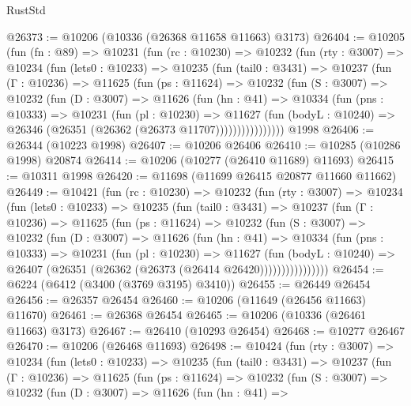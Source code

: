 \begin{lexlean}{RustStd}
\begin{coremodule}
@26373 := @10206 (@10336 (@26368 @11658 @11663) @3173)
@26404 := @10205
    (fun (fn : @89) =>
    @10231
      (fun (rc : @10230) =>
      @10232
        (fun (rty : @3007) =>
        @10234
          (fun (lets0 : @10233) =>
          @10235
            (fun (tail0 : @3431) =>
            @10237
              (fun (Γ : @10236) =>
              @11625
                (fun (ps : @11624) =>
                @10232
                  (fun (S : @3007) =>
                  @10232
                    (fun (D : @3007) =>
                    @11626
                      (fun (hn : @41) =>
                      @10334
                        (fun (pns : @10333) =>
                        @10231
                          (fun (pl : @10230) =>
                          @11627
                            (fun (bodyL : @10240) =>
                            @26346 (@26351 (@26362 (@26373 @11707))))))))))))))))
    @1998
@26406 := @26344 (@10223 @1998)
@26407 := @10206 @26406
@26410 := @10285 (@10286 @1998) @20874
@26414 := @10206 (@10277 (@26410 @11689) @11693)
@26415 := @10311 @1998
@26420 := @11698 (@11699 @26415 @20877 @11660 @11662)
@26449 := @10421
    (fun (rc : @10230) =>
    @10232
      (fun (rty : @3007) =>
      @10234
        (fun (lets0 : @10233) =>
        @10235
          (fun (tail0 : @3431) =>
          @10237
            (fun (Γ : @10236) =>
            @11625
              (fun (ps : @11624) =>
              @10232
                (fun (S : @3007) =>
                @10232
                  (fun (D : @3007) =>
                  @11626
                    (fun (hn : @41) =>
                    @10334
                      (fun (pns : @10333) =>
                      @10231
                        (fun (pl : @10230) =>
                        @11627
                          (fun (bodyL : @10240) =>
                          @26407 (@26351 (@26362 (@26373 (@26414 @26420))))))))))))))))
@26454 := @6224 (@6412 (@3400 (@3769 @3195) @3410))
@26455 := @26449 @26454
@26456 := @26357 @26454
@26460 := @10206 (@11649 (@26456 @11663) @11670)
@26461 := @26368 @26454
@26465 := @10206 (@10336 (@26461 @11663) @3173)
@26467 := @26410 (@10293 @26454)
@26468 := @10277 @26467
@26470 := @10206 (@26468 @11693)
@26498 := @10424
    (fun (rty : @3007) =>
    @10234
      (fun (lets0 : @10233) =>
      @10235
        (fun (tail0 : @3431) =>
        @10237
          (fun (Γ : @10236) =>
          @11625
            (fun (ps : @11624) =>
            @10232
              (fun (S : @3007) =>
              @10232
                (fun (D : @3007) =>
                @11626
                  (fun (hn : @41) =>

\end{coremodule}
\end{lexlean}
